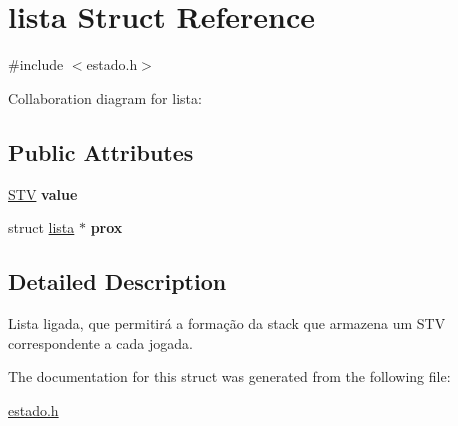 \hypertarget{structlista}{\section{lista Struct Reference}
\label{structlista}
}


{\ttfamily \#include $<$estado.\+h$>$}



Collaboration diagram for lista\+:
\subsection*{Public Attributes}
\begin{DoxyCompactItemize}
\item 
\hypertarget{structlista_a0faf00e1d1fd9a02b208d55799e9dd81}{\hyperlink{estado_8h_a8caee87c7dee89cd4657d684a2777d15}{S\+T\+V} {\bfseries value}}\label{structlista_a0faf00e1d1fd9a02b208d55799e9dd81}

\item 
\hypertarget{structlista_a3b0e375147c1163d74544fd206a1f1de}{struct \hyperlink{structlista}{lista} $\ast$ {\bfseries prox}}\label{structlista_a3b0e375147c1163d74544fd206a1f1de}

\end{DoxyCompactItemize}


\subsection{Detailed Description}
Lista ligada, que permitirá a formação da stack que armazena um S\+T\+V correspondente a cada jogada. 

The documentation for this struct was generated from the following file\+:\begin{DoxyCompactItemize}
\item 
\hyperlink{estado_8h}{estado.\+h}\end{DoxyCompactItemize}
